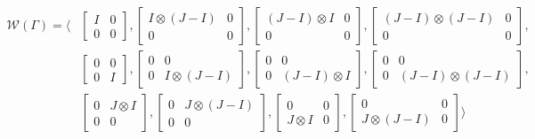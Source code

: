 \documentclass{article}
\begin{document}
\begin{align*}
    \mathcal{W}(\Gamma) = \langle
    &\begin{bmatrix}
        I & 0 \\
        0 & 0
    \end{bmatrix},
    \begin{bmatrix}
        I \otimes (J-I) & 0 \\
        0 & 0
    \end{bmatrix},
    \begin{bmatrix}
        (J-I) \otimes I & 0 \\
        0 & 0
    \end{bmatrix},
    \begin{bmatrix}
        (J-I) \otimes (J-I) & 0 \\
        0 & 0
    \end{bmatrix}, \\
    &\begin{bmatrix}
        0 & 0 \\
        0 & I
    \end{bmatrix},
    \begin{bmatrix}
        0 & 0 \\
        0 & I \otimes (J-I)
    \end{bmatrix},
    \begin{bmatrix}
        0 & 0 \\
        0 & (J-I) \otimes I
    \end{bmatrix},
    \begin{bmatrix}
        0 & 0 \\
        0 & (J-I) \otimes (J-I)
    \end{bmatrix}, \\
    &\begin{bmatrix}
        0 & J\otimes I \\
        0 & 0
    \end{bmatrix},
    \begin{bmatrix}
        0 & J\otimes (J-I) \\
        0 & 0
    \end{bmatrix}, 
    \begin{bmatrix}
        0 & 0 \\
        J\otimes I & 0
    \end{bmatrix},
    \begin{bmatrix}
        0 & 0 \\
        J\otimes (J-I) & 0
    \end{bmatrix}
    \rangle
\end{align*}
\end{document}
